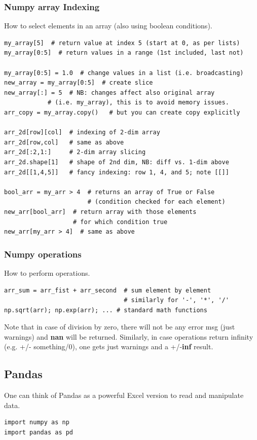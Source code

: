 \documentclass[11pt]{article}
\begin{document}
\subsubsection{Numpy array Indexing}
How to select elements in an array (also using boolean conditions).

\begin{lstlisting}
my_array[5]  # return value at index 5 (start at 0, as per lists)
my_array[0:5]  # return values in a range (1st included, last not)
 
my_array[0:5] = 1.0  # change values in a list (i.e. broadcasting)
new_array = my_array[0:5]  # create slice
new_array[:] = 5  # NB: changes affect also original array 
            # (i.e. my_array), this is to avoid memory issues.  
arr_copy = my_array.copy()   # but you can create copy explicitly 

arr_2d[row][col]  # indexing of 2-dim array
arr_2d[row,col]   # same as above
arr_2d[:2,1:]     # 2-dim array slicing
arr_2d.shape[1]   # shape of 2nd dim, NB: diff vs. 1-dim above
arr_2d[[1,4,5]]   # fancy indexing: row 1, 4, and 5; note [[]]

bool_arr = my_arr > 4  # returns an array of True or False 
                       # (condition checked for each element)
new_arr[bool_arr]  # return array with those elements 
                   # for which condition true
new_arr[my_arr > 4]  # same as above
\end{lstlisting}

\subsubsection{Numpy operations}
How to perform operations.
\begin{lstlisting}
arr_sum = arr_fist + arr_second  # sum element by element
                                 # similarly for '-', '*', '/'
np.sqrt(arr); np.exp(arr); ... # standard math functions
\end{lstlisting}
Note that in case of division by zero, there will not be any error msg (just warnings) and \textbf{nan} will be returned. Similarly, in case operations return infinity (e.g. +/- something/0), one gets just warnings and a +/-\textbf{inf} result.


\subsection{Pandas}
One can think of Pandas as a powerful Excel version to read and manipulate data.
\begin{lstlisting}
import numpy as np
import pandas as pd
\end{lstlisting}
\end{document}
